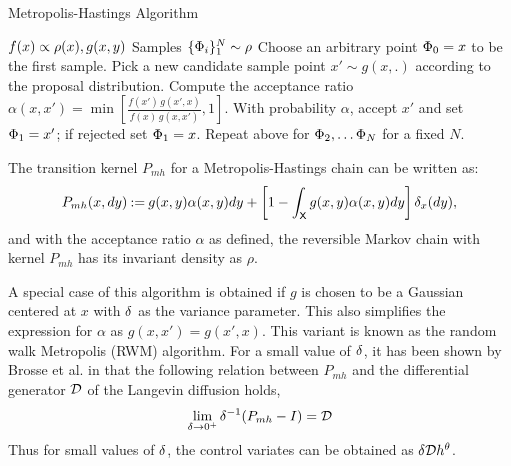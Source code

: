 \begin{algorithm}{Metropolis-Hastings Algorithm}
	\begin{algorithmic}[1]
	\Require $f(x) \propto \rho(x), g(x,y)$
	\Ensure Samples $\{\Phi_i\}_1^N \sim \rho$
	\State Choose an arbitrary point $\Phi_0 = x$ to be the first sample.
	\State Pick a new candidate sample point $x' \sim g (x,.) $ according to the proposal distribution.
	\State Compute the acceptance ratio $\alpha(x,x')= \min \left[ \frac{f(x') \, g (x',x)}{f(x) \, g(x,x')}, 1\right] $.
	\State With probability $\alpha$, accept $x'$ and set $\Phi_1 = x'$; if rejected set $\Phi_1 = x$.
	\State Repeat above for $ \Phi_2, \hdots \Phi_N$ for a fixed $N$.
	\end{algorithmic}
\end{algorithm}

The transition kernel $P_{mh}$ for a Metropolis-Hastings chain can be written as:
\begin{equation}
P_{mh}(x,dy) \eqdef g(x,y) \alpha(x,y) dy + \left [ 1 - \int_{\state} g(x,y) \alpha(x,y) dy \right] \delta_x (dy),
\label{e:kernel_mh}
\end{equation}
and with the acceptance ratio $\alpha$ as defined, the reversible Markov chain with kernel $P_{mh}$ has its invariant density as $\rho$.

A special case of this algorithm is obtained if $g$ is chosen to be a Gaussian centered at $x$ with $\delta$ as the variance parameter. This also simplifies the expression for $\alpha$ as $g(x,x') = g(x',x)$. This variant is known as the random walk Metropolis (RWM) algorithm. For a small value of $\delta$, it has been shown by Brosse et al. in \cite{brodurmeymourad18} that the following relation between $P_{mh}$ and the differential generator ${\cal D}$ of the Langevin diffusion holds, %
\[
\lim_{\delta \to 0^+} \delta^{-1} (P_{mh} - I) = {\cal D}
\]
Thus for small values of $\delta$, the control variates can be obtained as $\delta {\cal D} h^\theta$. %

